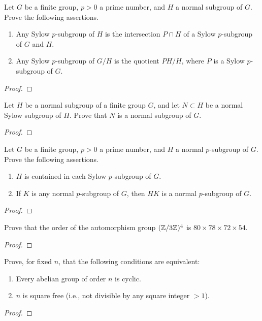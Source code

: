 \begin{problem}
Let $G$ be a finite group, $p>0$ a prime number, and $H$ a
normal subgroup of $G$. Prove the following assertions.
\begin{enumerate}[label=(\alph*)]
\item Any Sylow $p$-subgroup of $H$ is the intersection
$P\cap H$ of a Sylow $p$-subgroup of $G$ and $H$.
\item Any Sylow $p$-subgroup of $G/H$ is the quotient $PH/H$,
where $P$ is a Sylow $p$-subgroup of $G$.
\end{enumerate}
\end{problem}
\begin{proof}
\end{proof}

\begin{problem}
Let $H$ be a normal subgroup of a finite group $G$, and let
$N\subset H$ be a normal Sylow subgroup of $H$. Prove that $N$
is a normal subgroup of $G$.
\end{problem}
\begin{proof}
\end{proof}

\begin{problem}
Let $G$ be a finite group, $p>0$ a prime number, and $H$ a
normal $p$-subgroup of $G$. Prove the following assertions.
\begin{enumerate}[label=(\alph*)]
\item $H$ is contained in each Sylow $p$-subgroup of $G$.
\item If $K$ is any normal $p$-subgroup of $G$, then $HK$ is a
normal $p$-subgroup of $G$.
\end{enumerate}
\end{problem}
\begin{proof}
\end{proof}

\begin{problem}
Prove that the order of the automorphism group $(\mathbb{Z}/3\mathbb{Z})^4$
is $80\times 78\times 72\times 54$.
\end{problem}
\begin{proof}
\end{proof}

\begin{problem}
Prove, for fixed $n$, that the following conditions are
equivalent:
\begin{enumerate}[label=(\alph*)]
\item Every abelian group of order $n$ is cyclic.
\item $n$ is square free (i.e., not divisible by any square
integer $>1$).
\end{enumerate}
\end{problem}
\begin{proof}
\end{proof}

